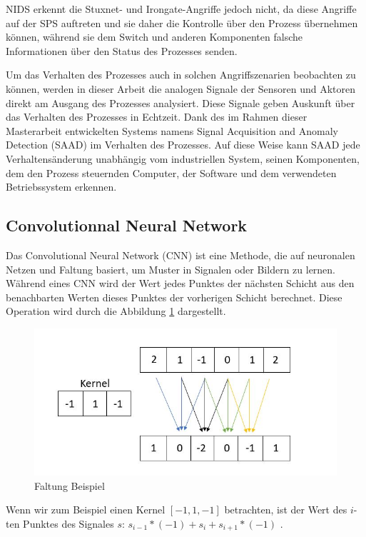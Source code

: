 \documentclass[12pt,a4paper]{scrartcl}
\numberwithin{equation}{section}
\begin{document}
NIDS erkennt die Stuxnet- und Irongate-Angriffe jedoch nicht, da diese Angriffe auf der SPS auftreten und sie daher die Kontrolle über den Prozess übernehmen können, während sie dem Switch und anderen Komponenten falsche Informationen über den Status des Prozesses senden.

Um das Verhalten des Prozesses auch in solchen Angriffszenarien beobachten zu können, werden in dieser Arbeit die analogen Signale der Sensoren und Aktoren direkt am Ausgang des Prozesses analysiert. Diese Signale geben Auskunft über das Verhalten des Prozesses in Echtzeit. Dank des im Rahmen dieser Masterarbeit entwickelten Systems namens Signal Acquisition and Anomaly Detection (SAAD) im Verhalten des Prozesses. Auf diese Weise kann SAAD jede Verhaltensänderung unabhängig vom industriellen System, seinen Komponenten, dem den Prozess steuernden Computer, der Software und dem verwendeten Betriebssystem erkennen.

\subsection{Convolutionnal Neural Network}

Das Convolutional Neural Network (CNN) ist eine Methode, die auf neuronalen Netzen und Faltung basiert, um Muster in Signalen oder Bildern zu lernen. Während eines CNN wird der Wert jedes Punktes der nächsten Schicht aus den benachbarten Werten dieses Punktes der vorherigen Schicht berechnet. Diese Operation wird durch die Abbildung \ref{conv} dargestellt.

\begin{figure}[ht!]
	\centering
	  \includegraphics[scale=0.6]{conv.jpg}
	  \caption{Faltung Beispiel}
	\label{conv}
\end{figure}

Wenn wir zum Beispiel einen Kernel $[-1,1, -1]$ betrachten, ist der Wert des $i$-ten Punktes des Signales $s$:
 $s_{i-1} * (- 1) + s_{i} + s_{i + 1} * (- 1)$ .
\end{document}
